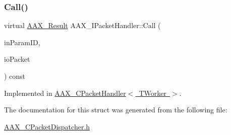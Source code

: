 \subsubsection{\texorpdfstring{Call()}{Call()}}
{\footnotesize\ttfamily virtual \mbox{\hyperlink{a00392_a4d8f69a697df7f70c3a8e9b8ee130d2f}{A\+A\+X\+\_\+\+Result}} A\+A\+X\+\_\+\+I\+Packet\+Handler\+::\+Call (\begin{DoxyParamCaption}\item[{\mbox{\hyperlink{a00392_a1440c756fe5cb158b78193b2fc1780d1}{A\+A\+X\+\_\+\+C\+Param\+ID}}}]{in\+Param\+ID,  }\item[{\mbox{\hyperlink{a01513}{A\+A\+X\+\_\+\+C\+Packet}} \&}]{io\+Packet }\end{DoxyParamCaption}) const\hspace{0.3cm}{\ttfamily [pure virtual]}}



Implemented in \mbox{\hyperlink{a01525_a29228bebdc801e6cbf0b67873c6d69ca}{A\+A\+X\+\_\+\+C\+Packet\+Handler$<$ T\+Worker $>$}}.



The documentation for this struct was generated from the following file\+:\begin{DoxyCompactItemize}
\item 
\mbox{\hyperlink{a00452}{A\+A\+X\+\_\+\+C\+Packet\+Dispatcher.\+h}}\end{DoxyCompactItemize}
